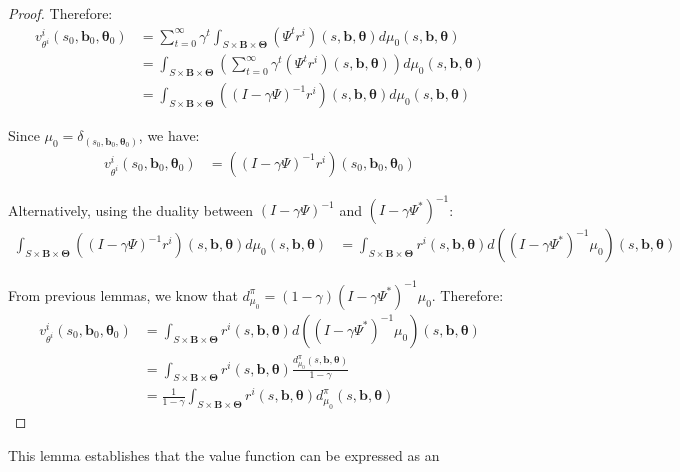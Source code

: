 \begin{proof}
    Therefore:
    \begin{align}
        v^{i}_{\theta^i}(s_{0}, \boldsymbol{b}_{0}, \boldsymbol{\theta}_{0}) & = \sum_{t=0}^{\infty}\gamma^{t} \int_{S \times \boldsymbol{B} \times \boldsymbol{\Theta}}(\Psi^{t} r^{i})(s, \boldsymbol{b}, \boldsymbol{\theta}) d\mu_{0}(s, \boldsymbol{b}, \boldsymbol{\theta})              \\
                                                                             & = \int_{S \times \boldsymbol{B} \times \boldsymbol{\Theta}}\left(\sum_{t=0}^{\infty}\gamma^{t} (\Psi^{t} r^{i})(s, \boldsymbol{b}, \boldsymbol{\theta})\right) d\mu_{0}(s, \boldsymbol{b}, \boldsymbol{\theta}) \\
                                                                             & = \int_{S \times \boldsymbol{B} \times \boldsymbol{\Theta}}((I - \gamma \Psi)^{-1}r^{i})(s, \boldsymbol{b}, \boldsymbol{\theta}) d\mu_{0}(s, \boldsymbol{b}, \boldsymbol{\theta})
    \end{align}

    Since $\mu_{0} = \delta_{(s_0, \boldsymbol{b}_0, \boldsymbol{\theta}_0)}$, we have:
    \begin{align}
        v^{i}_{\theta^i}(s_{0}, \boldsymbol{b}_{0}, \boldsymbol{\theta}_{0}) & = ((I - \gamma \Psi)^{-1}r^{i})(s_{0}, \boldsymbol{b}_{0}, \boldsymbol{\theta}_{0})
    \end{align}

    Alternatively, using the duality between $(I - \gamma \Psi)^{-1}$ and
    $(I - \gamma \Psi^{*})^{-1}$:
    \begin{align}
        \int_{S \times \boldsymbol{B} \times \boldsymbol{\Theta}}((I - \gamma \Psi)^{-1}r^{i})(s, \boldsymbol{b}, \boldsymbol{\theta}) d\mu_{0}(s, \boldsymbol{b}, \boldsymbol{\theta}) & = \int_{S \times \boldsymbol{B} \times \boldsymbol{\Theta}}r^{i}(s, \boldsymbol{b}, \boldsymbol{\theta}) d((I - \gamma \Psi^{*})^{-1}\mu_{0})(s, \boldsymbol{b}, \boldsymbol{\theta})
    \end{align}

    From previous lemmas, we know that $d^{\pi}_{\mu_0}= (1-\gamma) (I - \gamma \Psi
        ^{*})^{-1}\mu_{0}$. Therefore:
    \begin{align}
        v^{i}_{\theta^i}(s_{0}, \boldsymbol{b}_{0}, \boldsymbol{\theta}_{0}) & = \int_{S \times \boldsymbol{B} \times \boldsymbol{\Theta}}r^{i}(s, \boldsymbol{b}, \boldsymbol{\theta}) d((I - \gamma \Psi^{*})^{-1}\mu_{0})(s, \boldsymbol{b}, \boldsymbol{\theta}) \\
                                                                             & = \int_{S \times \boldsymbol{B} \times \boldsymbol{\Theta}}r^{i}(s, \boldsymbol{b}, \boldsymbol{\theta}) \frac{d^{\pi}_{\mu_0}(s, \boldsymbol{b}, \boldsymbol{\theta})}{1-\gamma}     \\
                                                                             & = \frac{1}{1-\gamma}\int_{S \times \boldsymbol{B} \times \boldsymbol{\Theta}}r^{i}(s, \boldsymbol{b}, \boldsymbol{\theta}) d^{\pi}_{\mu_0}(s, \boldsymbol{b}, \boldsymbol{\theta})
    \end{align}
\end{proof}This lemma establishes that the value function can be expressed as an
